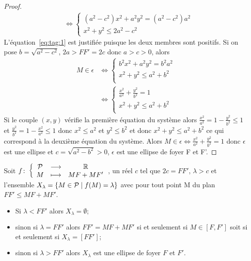 \begin{proof}
\begin{align}
                   & \iff \begin{cases} (a^2-c^2)x^2 +a^2y^2 = (a^2-c^2)a^2  \\ 
                   x^2 + y^2 \leqslant 2a^2 -c^2\end{cases}
  \end{align}
  L'équation~\eqref{eq:tag:1} est justifiée puisque les deux membres sont 
  positifs. Si on  pose \(b = \sqrt{a^2-c^2}\), \(2a>FF' = 2c\) donc \(a>c>0\), 
  alors
  \begin{align}
    M \in \epsilon & \iff \begin{cases} b^2x^2 +a^2y^2 = b^2a^2 \\ x^2 + y^2 
    \leqslant a^2 +b^2\\\end{cases}\\
                   & \iff \begin{cases} \frac{x^2}{a^2} +\frac{y^2}{b^2} = 1\\ 
                   x^2 + y^2 \leqslant a^2 +b^2 \\\end{cases}
  \end{align}
  Si le couple \((x, y)\) vérifie la première équation du système alors 
  \(\frac{x^2}{a^2} = 1-\frac{y^2}{b^2}\leqslant 1\) et 
  \(\frac{y^2}{b^2} = 1-\frac{x^2}{a^2} \leqslant 1\) donc \(x^2 \leqslant a^2\) 
  et \(y^2 \leqslant b^2\) et donc \(x^2 + y^2 \leqslant a^2 + b^2\) ce qui 
  correspond à la deuxième équation du système.
  Alors \(M \in \epsilon \iff \frac{x^2}{a^2} +\frac{y^2}{b^2} = 1\) donc 
  \(\epsilon\) est une ellipse et \(c = \sqrt{a^2-b^2}>0\), \(\epsilon\) est une 
  ellipse de foyer F et F'.
\end{proof}
Soit \(f\colon\left\{\begin{array}{ccc}\mathcal{P} & \longrightarrow &\mathbb{R}\\M & \longmapsto & MF + MF'\end{array}\right.\), un réel \(c\) tel que \(2c = FF'\), 
\(\lambda>c\) et l'ensemble \(X_\lambda = \left\{M \in \mathcal{P}\mathrel{}\middle|\mathrel{}f(M) = \lambda\right\}\) avec 
pour tout point M du plan \(FF'\leqslant MF + MF'\).
\begin{itemize}
  \item Si \(\lambda < FF'\) alors \(X_\lambda = \emptyset\);
  \item sinon si \(\lambda = FF'\) alors \(FF' = MF + MF'\) si et seulement si \(M 
    \in [F, F']\) soit si et seulement si \(X_\lambda = [FF']\);
  \item sinon si \(\lambda >FF'\) alors \(X_\lambda\) est une ellipse de foyer 
    \(F\) et \(F'\).
\end{itemize}

